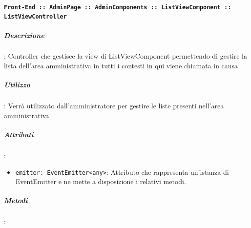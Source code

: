 \documentclass[../DefinizioneDiProdotto_v3.0.0.tex]{subfiles}
\begin{document}
			      \paragraph{\texttt{Front-End :: AdminPage :: AdminComponents :: ListViewComponent :: ListViewController}}
			      	\subparagraph{Descrizione}: Controller che gestisce la view di ListViewComponent permettendo di gestire la lista dell'area amministrativa in tutti i contesti in qui viene chiamata in causa
			      	\subparagraph{Utilizzo}: Verrà utilizzato dall'amministratore per gestire le liste presenti nell'area amministrativa
			      	\subparagraph{Attributi}:
			      	      \begin{itemize}
			      	      	\item \texttt{emitter: EventEmitter<any>}: Attributo che rappresenta un'istanza di EventEmitter e ne mette a disposizione i relativi metodi.
			      	      \end{itemize}
			      	\subparagraph{Metodi}:
\end{document}
